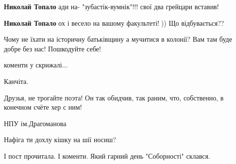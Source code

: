\begin{itemize}
\begin{itemize}
\textbf{Николай Топало} ади на- "зубастік-вумнік"!!! свої два грейцари вставив!

 
\textbf{Николай Топало} ох і весело на вашому факультеті!🤣)) Що відбувається??
\end{itemize}

 
Чому не їхати на історичну батьківщину а мучитися в колонії? Вам там буде добре без нас! Пошкодуйте себе!

 
коменти у скрижалі...

 
Канчіта.

 
Друзья, не трогайте поэта!
Он так обидчив, так раним,
что, собственно, в конечном счёте хер с ним!

 
НПУ ім.Драгоманова

 
Нафіга ти дохлу кішку на шії носиш?

 
І пост прочитала. І коменти. Який гарний день "Соборності" склався.

 


\end{itemize}
